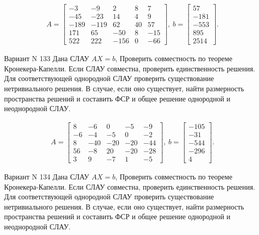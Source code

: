 \documentclass[11pt]{report}
\begin{document}
\begin{align*}
 A = \left[\begin{matrix}-3 & -9 & 2 & 8 & 7\\-45 & -23 & 14 & 4 & 9\\-189 & -119 & 62 & 40 & 57\\171 & 65 & -50 & 8 & -15\\522 & 222 & -156 & 0 & -66\end{matrix}\right],
\ b = \left[\begin{matrix}57\\-181\\-553\\895\\2514\end{matrix}\right]. 
 \end{align*}

Вариант N 133
Дана СЛАУ $AX = b$,
Проверить совместность по теореме Кронекера-Капелли. Если СЛАУ совместна, проверить единственность решения.
Для соответствующей однородной СЛАУ проверить существование нетривиального решения. В случае, если оно существует,
найти размерность пространства решений и составить ФСР и общее решение однородной  и неоднородной СЛАУ.


\begin{align*}
 A = \left[\begin{matrix}8 & -6 & 0 & -5 & -9\\-6 & -4 & -5 & 0 & -2\\8 & -40 & -20 & -20 & -44\\56 & -8 & 20 & -20 & -28\\3 & 9 & -7 & 1 & -5\end{matrix}\right],
\ b = \left[\begin{matrix}-105\\-31\\-544\\-296\\4\end{matrix}\right]. 
 \end{align*}

Вариант N 134
Дана СЛАУ $AX = b$,
Проверить совместность по теореме Кронекера-Капелли. Если СЛАУ совместна, проверить единственность решения.
Для соответствующей однородной СЛАУ проверить существование нетривиального решения. В случае, если оно существует,
найти размерность пространства решений и составить ФСР и общее решение однородной  и неоднородной СЛАУ.
\end{document}
